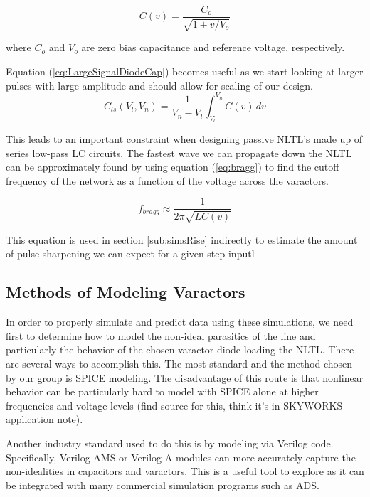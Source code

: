 \documentclass[journal]{IEEEtran} \usepackage[english]{babel}
\begin{document}
\begin{equation}\label{eq:nonlincap}
C(v) = \frac{C_{o}}{\sqrt{1+v/V_{o}}}
\end{equation}


where $C_{o}$ and $V_{o}$ are zero bias capacitance and reference voltage,
respectively.

Equation (\ref{eq:LargeSignalDiodeCap}) becomes useful as we start looking at
larger pulses with large amplitude and should allow for scaling of our design.
\begin{equation}\label{eq:LargeSignalDiodeCap}
C_{ls}(V_{l},V_{n}) = \frac{1}{V_{n}-V_{l}}\int_{V_{l}}^{V_{n}}C(v)\, dv
\end{equation}

This leads to an important constraint when designing passive NLTL's made up of
series low-pass LC circuits. The fastest wave we can propagate down the NLTL can
be approximately found by using equation (\ref{eq:bragg}) to find the cutoff
frequency of the network as a function of the voltage across the varactors. 

\begin{equation}\label{eq:bragg}
	f_{bragg} \approx \frac{1}{2\pi{}\sqrt{LC(v)}}	
\end{equation}

This equation is used in section \ref{sub:simsRise} indirectly to estimate the
amount of pulse sharpening we can expect for a given step inputl


\subsection{Methods of Modeling Varactors}\label{sub:VaracModeling}

In order to properly simulate and predict data using these simulations, we
need first to determine how to model the non-ideal parasitics of the line
and particularly the behavior of the chosen varactor diode loading the NLTL.
There are several ways to accomplish this. The most standard and the method
chosen by our group is SPICE modeling. The disadvantage of this route is
that nonlinear behavior can be particularly hard to model with SPICE alone
at higher frequencies and voltage levels (find source for this, think it's
in SKYWORKS application note).

Another industry standard used to do this is by modeling via Verilog code.
Specifically, Verilog-AMS or Verilog-A modules can more accurately capture
the non-idealities in capacitors and varactors. This is a useful tool to
explore as it can be integrated with many commercial simulation programs
such as ADS.
    
\end{document}
